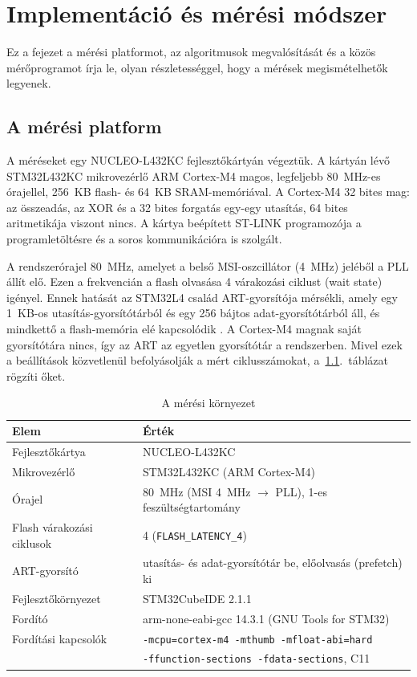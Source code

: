 \documentclass[a4paper,12pt]{report}
\theoremstyle{definition}
\theoremstyle{remark}
\begin{document}
\chapter{Implementáció és mérési módszer}\label{chap:implementacio}

Ez a fejezet a mérési platformot, az algoritmusok megvalósítását és a közös mérőprogramot írja le, olyan részletességgel, hogy a mérések megismételhetők legyenek.

\section{A mérési platform}\label{sec:platform}

A méréseket egy NUCLEO-L432KC fejlesztőkártyán végeztük. A kártyán lévő STM32L432KC mikrovezérlő ARM Cortex-M4 magos, legfeljebb 80~MHz-es órajellel, 256~KB flash- és 64~KB SRAM-memóriával. A Cortex-M4 32 bites mag: az összeadás, az XOR és a 32 bites forgatás egy-egy utasítás, 64 bites aritmetikája viszont nincs. A kártya beépített ST-LINK programozója a programletöltésre és a soros kommunikációra is szolgált.

A rendszerórajel 80~MHz, amelyet a belső MSI-oszcillátor (4~MHz) jeléből a PLL állít elő. Ezen a frekvencián a flash olvasása 4 várakozási ciklust (wait state) igényel. Ennek hatását az STM32L4 család ART-gyorsítója mérsékli, amely egy 1~KB-os utasítás-gyorsítótárból és egy 256 bájtos adat-gyorsítótárból áll, és mindkettő a flash-memória elé kapcsolódik \cite{RM0394}. A Cortex-M4 magnak saját gyorsítótára nincs, így az ART az egyetlen gyorsítótár a rendszerben. Mivel ezek a beállítások közvetlenül befolyásolják a mért ciklusszámokat, a~\ref{tab:platform}.~táblázat rögzíti őket.

\begin{table}[htbp]
	\centering
	\small
	\caption{A mérési környezet}
	\label{tab:platform}
	\begin{tabular}{|l|l|}
		\hline
		\textbf{Elem} & \textbf{Érték} \\ \hline
		Fejlesztőkártya & NUCLEO-L432KC \\ \hline
		Mikrovezérlő & STM32L432KC (ARM Cortex-M4) \\ \hline
		Órajel & 80~MHz (MSI 4~MHz $\rightarrow$ PLL), 1-es feszültségtartomány \\ \hline
		Flash várakozási ciklusok & 4 (\texttt{FLASH\_LATENCY\_4}) \\ \hline
		ART-gyorsító & utasítás- és adat-gyorsítótár be, előolvasás (prefetch) ki \\ \hline
		Fejlesztőkörnyezet & STM32CubeIDE 2.1.1
		\\ \hline
		Fordító & arm-none-eabi-gcc 14.3.1 (GNU Tools for STM32) \\ \hline
		Fordítási kapcsolók & \texttt{-mcpu=cortex-m4 -mthumb -mfloat-abi=hard} \\
		& \texttt{-ffunction-sections -fdata-sections}, C11 \\ \hline
	\end{tabular}
\end{table}
\end{document}
